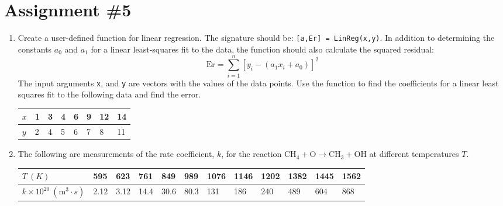 \chapter{Assignment \#5}
\label{ch:ass5n}

\begin{fullwidth}
\begin{enumerate}
\item Create a user-defined function for linear regression.  The signature should be: \lstinline[style=myMatlab]{[a,Er] = LinReg(x,y)}.  In addition to determining the constants $a_0$ and $a_1$ for a linear least-squares fit to the data, the function should also calculate the squared residual:
\begin{equation*}
\text{Er} = \sum\limits_{i=1}^{n}\left[y_i - \left(a_1 x_i + a_0\right) \right]^2
\end{equation*}
The input arguments \lstinline[style=myMatlab]{x}, and \lstinline[style=myMatlab]{y} are vectors with the values of the data points.  Use the function to find the coefficients for a linear least squares fit to the following data and find the error.

\begin{table}[h!]
\begin{tabular}{|l|l|l|l|l|l|l|l|}
\hline
$x$ & 1 & 3 & 4 & 6 & 9 & 12 & 14 \\ \hline
$y$ & 2 & 4 & 5 & 6 & 7 & 8 & 11 \\ \hline
\end{tabular}
\end{table}


\vspace{3.0cm}

\item The following are measurements of the rate coefficient, $k$, for the reaction $\text{CH}_{4} + \text{O} \rightarrow \text{CH}_3 + \text{OH}$ at different temperatures $T$.

\begin{table}[h!]
\begin{tabular}{|l|l|l|l|l|l|l|l|l|l|l|l|}
\hline
$T \ (K)$ & 595 & 623 & 761 & 849 & 989 & 1076 & 1146 & 1202 & 1382 & 1445 & 1562 \\ \hline
$k\times 10^20 \ (\text{m}^3 \cdot s)$ & 2.12 & 3.12 & 14.4 & 30.6 & 80.3 & 131 & 186 & 240 & 489 & 604 & 868 \\ \hline  
\end{tabular}
\end{table}

\vspace{0.25cm}


\end{enumerate}
\end{fullwidth}
